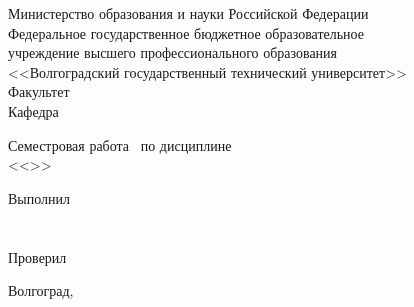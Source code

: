 \begin{titlepage}
\begin{center}
  Министерство образования и науки Российской Федерации \\
  Федеральное государственное бюджетное образовательное \\
  учреждение высшего профессионального образования \\
  <<Волгоградский государственный технический университет>> \\
  Факультет \\
  Кафедра
\end{center}
\vspace{9em}
\begin{center}
  \large
  Семестровая работа\
  по дисциплине\\
  <<>>\\
\end{center}
\vspace{5em}

\begin{flushright}
  \begin{minipage}{.40\textwidth}
    Выполнил\\ \\
    \vspace{1em}\\
    Проверил\\
  \end{minipage}
\end{flushright}
\vspace{\fill}
\begin{center}
  Волгоград, \the\year
\end{center}
\end{titlepage}
\setcounter{page}{2}
